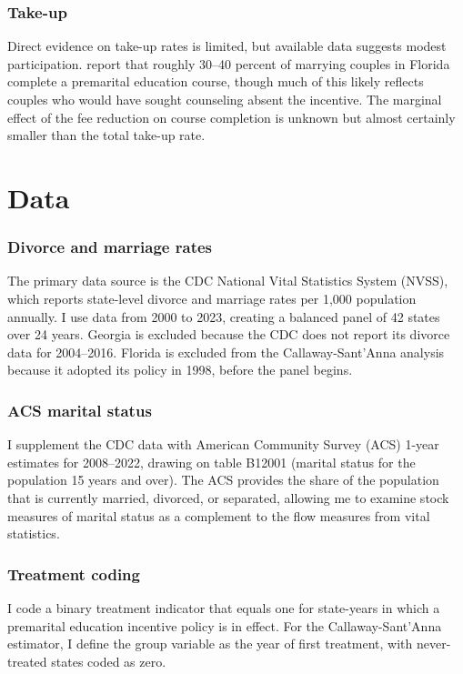 \documentclass[12pt]{article}
\begin{document}
\subsubsection*{Take-up} Direct evidence on take-up rates is limited, but available data suggests modest participation. \citet{stanley2006strengthening} report that roughly 30--40 percent of marrying couples in Florida complete a premarital education course, though much of this likely reflects couples who would have sought counseling absent the incentive. The marginal effect of the fee reduction on course completion is unknown but almost certainly smaller than the total take-up rate.


\section{Data}
\label{sec:data}

\subsubsection*{Divorce and marriage rates} The primary data source is the CDC National Vital Statistics System (NVSS), which reports state-level divorce and marriage rates per 1,000 population annually. I use data from 2000 to 2023, creating a balanced panel of 42 states over 24 years. Georgia is excluded because the CDC does not report its divorce data for 2004--2016. Florida is excluded from the Callaway-Sant'Anna analysis because it adopted its policy in 1998, before the panel begins.

\subsubsection*{ACS marital status} I supplement the CDC data with American Community Survey (ACS) 1-year estimates for 2008--2022, drawing on table B12001 (marital status for the population 15 years and over). The ACS provides the share of the population that is currently married, divorced, or separated, allowing me to examine stock measures of marital status as a complement to the flow measures from vital statistics.

\subsubsection*{Treatment coding} I code a binary treatment indicator that equals one for state-years in which a premarital education incentive policy is in effect. For the Callaway-Sant'Anna estimator, I define the group variable as the year of first treatment, with never-treated states coded as zero.
\end{document}
